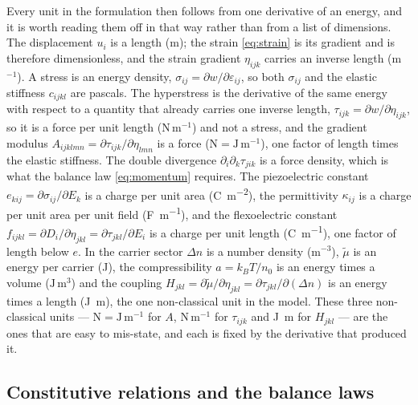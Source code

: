 Every unit in the formulation then follows from one derivative of an energy, and
it is worth reading them off in that way rather than from a list of dimensions.
The displacement $u_i$ is a length (m); the strain \eqref{eq:strain} is its
gradient and is therefore dimensionless, and the strain gradient $\eta_{ijk}$
carries an inverse length (m$^{-1}$).  A stress is an energy density,
$\sigma_{ij}=\partial w/\partial\varepsilon_{ij}$, so both $\sigma_{ij}$ and the
elastic stiffness $c_{ijkl}$ are pascals.  The hyperstress is the derivative of
the same energy with respect to a quantity that already carries one inverse
length, $\tau_{ijk}=\partial w/\partial\eta_{ijk}$, so it is a force per unit
length ($\mathrm{N\,m^{-1}}$) and not a stress, and the gradient modulus
$A_{ijklmn}=\partial\tau_{ijk}/\partial\eta_{lmn}$ is a force
($\mathrm{N}=\mathrm{J\,m^{-1}}$), one factor of length times the elastic stiffness.  The double
divergence $\partial_i\partial_k\tau_{jik}$ is a force density, which is what
the balance law \eqref{eq:momentum} requires.  The piezoelectric constant
$e_{kij}=\partial\sigma_{ij}/\partial E_k$ is a charge per unit area
(\si{\coulomb\per\square\metre}), the permittivity $\kappa_{ij}$ is a charge
per unit area per unit field (\si{\farad\per\metre}), and the flexoelectric
constant $f_{ijkl}=\partial D_i/\partial\eta_{jkl}=\partial\tau_{jkl}/\partial
E_i$ is a charge per unit length (\si{\coulomb\per\metre}), one factor of
length below $e$.  In the carrier sector $\Delta n$ is a number density
(m$^{-3}$), $\widetilde\mu$ is an energy per carrier (J), the compressibility
$a=k_BT/n_0$ is an energy times a volume ($\mathrm{J\,m^{3}}$) and the
coupling $H_{jkl}=\partial\widetilde\mu/\partial\eta_{jkl}=\partial\tau_{jkl}/
\partial(\Delta n)$ is an energy times a length (\si{\joule\metre}), the one
non-classical unit in the model.  These three non-classical units ---
$\mathrm{N}=\mathrm{J\,m^{-1}}$ for $A$, $\mathrm{N\,m^{-1}}$ for $\tau_{ijk}$ and
\si{\joule\metre} for $H_{jkl}$ --- are the ones that are easy to mis-state, and
each is fixed by the derivative that produced it.


\subsection{Constitutive relations and the balance laws}
\label{sec:governing_constitutive}
\label{sec:governing_balance}

